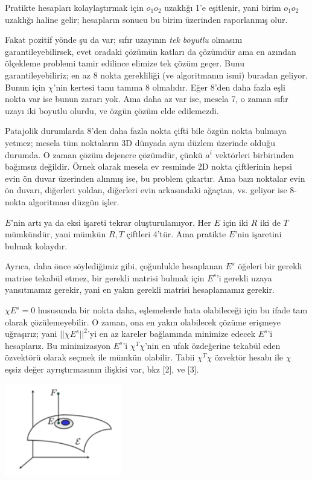 \documentclass[12pt,fleqn]{article}\usepackage{../../common}
\begin{document}
Pratikte hesapları kolaylaştırmak için $o_1o_2$ uzaklığı 1'e eşitlenir, yani
birim $o_1o_2$ uzaklığı haline gelir; hesapların sonucu bu birim üzerinden
raporlanmış olur.

Fakat pozitif yönde şu da var; sıfır uzayının {\em tek boyutlu} olmasını
garantileyebilirsek, evet oradaki çözümün katları da çözümdür ama en azından
ölçekleme problemi tamir edilince elimize tek çözüm geçer. Bunu
garantileyebiliriz; en az 8 nokta gerekliliği (ve algoritmanın ismi) buradan
geliyor. Bunun için $\chi$'nin kertesi tamı tamına 8 olmalıdır. Eğer 8'den daha
fazla eşli nokta var ise bunun zararı yok. Ama daha az var ise, mesela 7, o
zaman sıfır uzayı iki boyutlu olurdu, ve özgün çözüm elde edilemezdi.

Patajolik durumlarda 8'den daha fazla nokta çifti bile özgün nokta bulmaya
yetmez; mesela tüm noktaların 3D dünyada aynı düzlem üzerinde olduğu durumda. O
zaman çözüm dejenere çözümdür, çünkü $a^i$ vektörleri birbirinden bağımsız
değildir. Örnek olarak mesela ev resminde 2D nokta çiftlerinin hepsi evin ön
duvar üzerinden alınmış ise, bu problem çıkartır. Ama bazı noktalar evin ön
duvarı, diğerleri yoldan, diğerleri evin arkasındaki ağaçtan, vs. geliyor ise
8-nokta algoritması düzgün işler.

$E$'nin artı ya da eksi işareti tekrar oluşturulamıyor. Her $E$ için iki $R$ iki
de $T$ mümkündür, yani mümkün $R,T$ çiftleri 4'tür. Ama pratikte $E$'nin
işaretini bulmak kolaydır.

Ayrıca, daha önce söylediğimiz gibi, çoğunlukle hesaplanan $E^s$ öğeleri bir
gerekli matrise tekabül etmez, bir gerekli matrisi bulmak için $E^s$'i gerekli
uzaya yansıtmamız gerekir, yani en yakın gerekli matrisi hesaplamamız gerekir.

$\chi E^s = 0$ hususunda bir nokta daha, eşlemelerde hata olabileceği için
bu ifade tam olarak çözülemeyebilir. O zaman, ona en yakın olabilecek
çözüme erişmeye uğraşırız; yani $||\chi E^s||^2$'yi en az kareler
bağlamında minimize edecek $E^s$'i hesaplarız. Bu minimizasyon $E^s$'i
$\chi^T\chi$'nin en ufak özdeğerine tekabül eden özvektörü olarak seçmek
ile mümkün olabilir. Tabii $\chi^T\chi$ özvektör hesabı ile $\chi$ eşsiz
değer ayrıştırmasının ilişkisi var, bkz [2], ve [3].

\includegraphics[height=4cm]{eproj.png}
\end{document}
